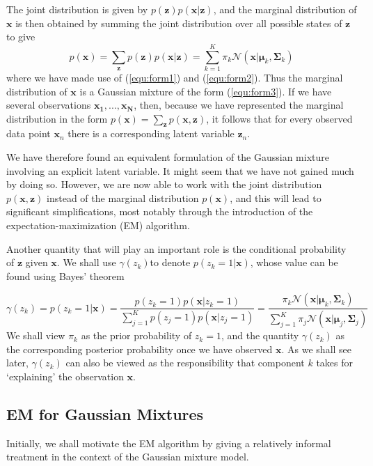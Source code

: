 ﻿\documentclass[a4paper, 11pt]{article}
\numberwithin{equation}{subsection}
\begin{document}
The joint distribution is given by $p(\mathbf z)p(\mathbf x|\mathbf z)$, and the marginal distribution of $\mathbf x$ is then obtained by summing the joint distribution over all possible states of $\mathbf z$ to give
\begin{equation}
p(\mathbf x)=\sum_{\mathbf z}p(\mathbf z)p(\mathbf x|\mathbf z)=\sum_{k=1}^K\pi_k\mathcal N(\mathbf x|\boldsymbol\mu_k,\boldsymbol\Sigma_k)
\end{equation}
where we have made use of (\ref{equ:form1}) and (\ref{equ:form2}). Thus the marginal distribution of $\mathbf x$ is a Gaussian mixture of the form (\ref{equ:form3}). If we have several observations $\mathbf{x_1,...,x_N}$, then, because we have represented the marginal distribution in the form $p(\mathbf x)=\sum_{\mathbf z}p(\mathbf x,\mathbf z)$, it follows that for every observed data point $\mathbf x_n$ there is a corresponding latent variable $\mathbf z_n$.

We have therefore found an equivalent formulation of the Gaussian mixture involving an explicit latent variable. It might seem that we have not gained much by doing so. However, we are now able to work with the joint distribution $p(\mathbf x, \mathbf z)$ instead of the marginal distribution $p(\mathbf x)$, and this will lead to significant simplifications, most notably through the introduction of the expectation-maximization (EM) algorithm.

Another quantity that will play an important role is the conditional probability of $\mathbf z$ given $\mathbf x$. We shall use $\gamma(z_k)$to denote $p(z_k=1|\mathbf x)$, whose value can be found using Bayes’ theorem

\begin{equation}
\gamma(z_k)=p(z_k=1|\mathbf x)=\frac{p(z_k=1)p(\mathbf x|z_k=1)}{\sum_{j=1}^Kp(z_j=1)p(\mathbf x|z_j=1)}=\frac{\pi_k\mathcal N(\mathbf x|\boldsymbol\mu_k,\boldsymbol\Sigma_k)}{\sum_{j=1}^K\pi_j\mathcal N(\mathbf x|\boldsymbol\mu_j,\boldsymbol\Sigma_j)}
\end{equation}
We shall view $\pi_k$ as the prior probability of $z_k=1$, and the quantity $\gamma(z_k)$ as the corresponding posterior probability once we have observed $\mathbf x$. As we shall see later, $\gamma(z_k)$ can also be viewed as the responsibility that component $k$ takes for ‘explaining’ the observation $\mathbf x$.




\subsection{EM for Gaussian Mixtures}
Initially, we shall motivate the EM algorithm by giving a relatively informal treatment in the context of the Gaussian mixture model.
\end{document}
